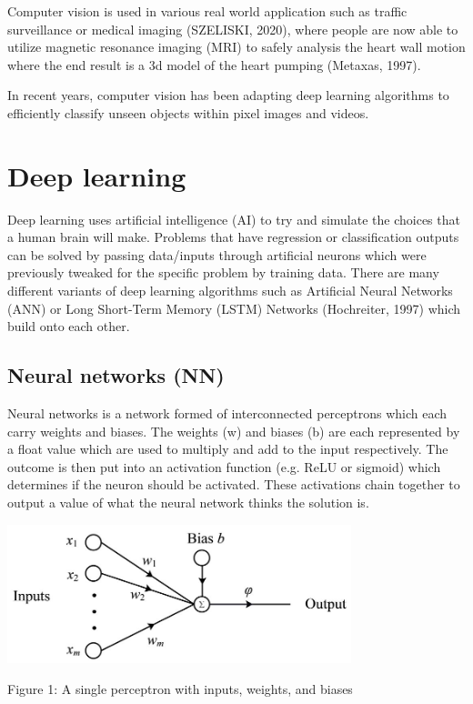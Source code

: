 \documentclass[12pt]{report}
\begin{document}
Computer vision is used in various real world application such as traffic surveillance or medical imaging (SZELISKI, 2020), where people are now able to utilize magnetic resonance imaging (MRI) to safely analysis the heart wall motion where the end result is a 3d model of the heart pumping (Metaxas, 1997). 

In recent years, computer vision has been adapting deep learning algorithms to efficiently classify unseen objects within pixel images and videos. 


\section{Deep learning}

Deep learning uses artificial intelligence (AI) to try and simulate the choices that a human brain will make. Problems that have regression or classification outputs can be solved by passing data/inputs through artificial neurons which were previously tweaked for the specific problem by training data. There are many different variants of deep learning algorithms such as Artificial Neural Networks (ANN) or Long Short-Term Memory (LSTM) Networks (Hochreiter, 1997) which build onto each other.

\subsection{Neural networks (NN)}

Neural networks is a network formed of interconnected perceptrons which each carry weights and biases. The weights (w) and biases (b) are each represented by a float value which are used to multiply and add to the input respectively. The outcome is then put into an activation function (e.g. ReLU or sigmoid) which determines if the neuron should be activated. These activations chain together to output a value of what the neural network thinks the solution is. 

\vspace{5 mm}

\begin{centering}
	
\includegraphics[width=100mm]{./images/weights and biases.png}

{Figure 1: A single perceptron with inputs, weights, and biases}

\end{centering}
\end{document}
